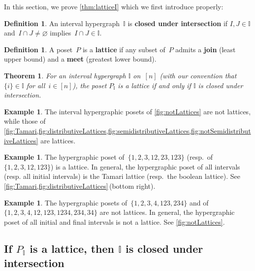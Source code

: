 \documentclass{amsart}
\newtheorem{theoremA}{Theorem}
\theoremstyle{definition}
\newtheorem{definition}[theorem]{Definition}
\newtheorem{example}[theorem]{Example}
\newcommand{\defn}[1]{\textbf{\textsf{\color{PineGreen} #1}}} %
\newcommand{\II}{\mathbb I} %
\begin{document}
In this section, we prove \cref{thm:latticeI} which we first introduce properly:

\begin{definition}
\label{def:intersectionClosed}
An interval hypergraph~$\II$ is \defn{closed under intersection} if $I, J \in \II$ and~$I \cap J \ne \varnothing$ implies~$I \cap J \in \II$.
\end{definition}

\begin{definition}
A poset~$P$ is a \defn{lattice} if any subset of~$P$ admits a \defn{join} (least upper bound) and a \defn{meet} (greatest lower bound).
\end{definition}

\begin{theoremA}
For an interval hypergraph $\II$ on~$[n]$ (with our convention that~$\{i\} \in \II$ for all~$i \in [n]$), the poset $P_\II$ is a lattice if and only if $\II$ is closed under intersection.
\end{theoremA}

\begin{example}
The interval hypergraphic posets of \cref{fig:notLattices} are not lattices, while those of \cref{fig:Tamari,fig:distributiveLattices,fig:semidistributiveLattices,fig:notSemidistributiveLattices} are lattices.
\end{example}

\begin{example}
The hypergraphic poset of~$\{ 1, 2, 3, 12, 23, 123\}$ (resp.~of~$\{ 1, 2, 3, 12, 123\}$) is a lattice.
In general, the hypergraphic poset of all intervals (resp. all initial intervals) is the Tamari lattice (resp.~the boolean lattice).
See \cref{fig:Tamari,fig:distributiveLattices}\,(bottom right).
\end{example}

\begin{example}
The hypergraphic posets of~$\{1, 2, 3, 4, 123, 234\}$ and of~$\{ 1, 2, 3, 4, 12, 123, 1234, 234, 34\}$ are not lattices.
In general, the hypergraphic poset of all initial and final intervals is not a lattice.
See \cref{fig:notLattices}.
\end{example}


\subsection{If $P_\II$ is a lattice, then $\II$ is closed under intersection}  
\label{subsec:latticeForward}
\end{document}
